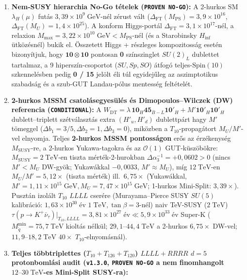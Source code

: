 \documentclass[11pt,a4paper]{article}
\begin{document}
\begin{enumerate}
    \item \textbf{Nem-SUSY hierarchia No-Go tételek (\texttt{PROVEN NO-GO}):} A 2-hurkos SM $\lambda_H(\mu)$ futás $3{,}39\times 10^9\;\mathrm{GeV}$-nél zérust vált ($\Delta_{\mathrm{FT}}(M_{\mathrm{PS}}) = 3{,}9\times 10^{16}$, $\Delta_{\mathrm{FT}}(M_U) = 1{,}4\times 10^{25}$). A konform Higgs-portál $\Delta_{\mathrm{FT}} = 3{,}1\times 10^{17}$-nél, a relaxion $M_{\max} = 3{,}22\times 10^{10}\;\mathrm{GeV} < M_{\mathrm{PS}}$-nél (és a Starobinsky $H_{\mathrm{inf}}$ ütközésnél) bukik el. Összetett Higgs + részleges kompozitosság esetén bizonyítjuk, hogy $\mathbf{10}\otimes\mathbf{10}$ pontosan \textbf{0} színszinglet $SU(2)_L$ dublettet tartalmaz, a 9 hiperszín-csoportot ($SU, Sp, SO$) átfogó teljes-$\mathrm{Spin}(10)$ szkennelésben pedig \textbf{0 / 15} jelölt éli túl egyidejűleg az aszimptotikus szabadság és a szub-GUT Landau-pólus mentesség feltételét.
    \item \textbf{2-hurkos MSSM csatolásegyesülés és Dimopoulos--Wilczek (DW) referencia (\texttt{CONDITIONAL}):}
    A $W_{\mathrm{DT}} = \lambda\,\mathbf{10}_H\mathbf{45}_{B-L}\mathbf{10}'_H + M'\mathbf{10}'_H\mathbf{10}'_H$ dublett--triplett szétválasztás extra $(H'_u, H'_d)$ dublettpárt hagy $M'$ tömeggel ($\Delta b_1 = 3/5, \Delta b_2 = 1, \Delta b_3 = 0$), miközben a $T_{10}$-propagátort $M_U/M'$-vel elnyomja. Teljes \textbf{2-hurkos MSSM pontosságon} erős az érzékenység $M_{\mathrm{SUSY}}$-re, a 2-hurkos Yukawa-tagokra és az $\mathcal{O}(1)$ GUT-küszöbökre: $M_{\mathrm{SUSY}} = 2\;\mathrm{TeV}$-en tiszta mérték-2-hurokban $\Delta\alpha_3^{-1} = +0{,}0602 > 0$ (nincs $M' < M_U$ DW-gyök; Yukawákkal $-0{,}0033$, $M' \approx M_U$), míg $12\;\mathrm{TeV}$-en $M_U/M' = 5{,}12\times$ (tiszta mérték) ill.\ $6{,}75\times$ (Yukawákkal, $M' = 1{,}11\times 10^{15}\;\mathrm{GeV}, M_U = 7{,}47\times 10^{15}\;\mathrm{GeV}$; 1-hurkos Mini-Split: $3{,}39\times$). Pusztán izolált $T_{10}$ $LLLL$ cserére (Murayama--Pierce SUSY $SU(5)$ kalibráció: $1{,}63\times 10^{30}\;\text{év}$ $1\;\mathrm{TeV}, \tan\beta=3$-nél) naiv TeV-SUSY ($2\;\mathrm{TeV}$) $\tau(p\to K^+\bar\nu_\tau)|_{T_{10},LLLL} = 3{,}81\times 10^{27}\;\text{év} \ll 5{,}9\times 10^{33}\;\text{év}$ Super-K ($M_{\tilde q}^{\min} = 75{,}7\;\mathrm{TeV}$ kioltás nélkül; $29{,}1\text{--}44{,}4\;\mathrm{TeV}$ a 2-hurkos $6{,}75\times$ DW-vel; $11{,}9\text{--}18{,}2\;\mathrm{TeV}$ $40\times$ $T_{10}$-elnyomásnál).
    \item \textbf{Teljes többtriplettes ($T_{10} + T_{126} + T_{120}$) $LLLL + RRRR$ $d=5$ protonbomlási audit (\texttt{v1.3.0}, \texttt{PROVEN NO-GO} a nem finomhangolt $12\text{--}30\;\mathrm{TeV}$-es Mini-Split SUSY-ra):}

\end{enumerate}
\end{document}
